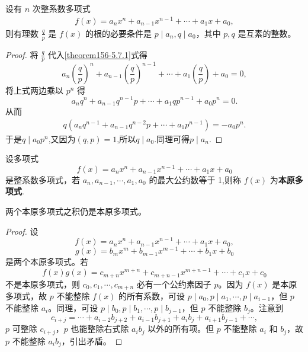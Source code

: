 \documentclass[lang=cn,newtx,10pt,scheme=chinese]{elegantbook}
\begin{document}
\begin{theorem}[整系数多项式有理根定理]\label{theorem:整系数多项式有理根定理}
设有 \( n \) 次整系数多项式
\begin{align}
f(x) = a_n x^n + a_{n-1} x^{n-1} + \cdots + a_1 x + a_0, \label{theorem156-5.7.1}
\end{align}
则有理数 \( \frac{q}{p} \) 是 \( f(x) \) 的根的必要条件是 \( p \mid a_n, q \mid a_0 \)，其中 \( p, q \) 是互素的整数。
\end{theorem}
\begin{proof}
将 \( \frac{q}{p} \) 代入\eqref{theorem156-5.7.1}式得
\[
a_n \left( \frac{q}{p} \right)^n + a_{n-1} \left( \frac{q}{p} \right)^{n-1} + \cdots + a_1 \left( \frac{q}{p} \right) + a_0 = 0,
\]
将上式两边乘以 \( p^n \) 得
\[
a_n q^n + a_{n-1} q^{n-1} p + \cdots + a_1 q p^{n-1} + a_0 p^n = 0.
\]
从而
\begin{align*}
q\left( a_nq^{n-1}+a_{n-1}q^{n-2}p+\cdots +a_1p^{n-1} \right) =-a_0p^n.
\end{align*}
于是$q\mid a_0p^n$,又因为$(q,p)=1$,所以$q\mid a_0$.同理可得$p \mid a_n$.
\end{proof}

\begin{definition}[本原多项式]
设多项式
\[
f(x) = a_n x^n + a_{n-1} x^{n-1} + \cdots + a_1 x + a_0
\]
是整系数多项式，若 \( a_n, a_{n-1}, \cdots, a_1, a_0 \) 的最大公约数等于 1,则称 \( f(x) \) 为\textbf{本原多项式}.
\end{definition}

\begin{lemma}[Gauss引理]\label{lemma:Gauss引理}
两个本原多项式之积仍是本原多项式。
\end{lemma}
\begin{proof}
设
\[
f(x) = a_n x^n + a_{n-1} x^{n-1} + \cdots + a_1 x + a_0,
\]
\[
g(x) = b_m x^m + b_{m-1} x^{m-1} + \cdots + b_1 x + b_0
\]
是两个本原多项式。若
\[
f(x) g(x) = c_{m+n} x^{m+n} + c_{m+n-1} x^{m+n-1} + \cdots + c_1 x + c_0
\]
不是本原多项式，则 \( c_0, c_1, \cdots, c_{m+n} \) 必有一个公约素因子 \( p \)。因为 \( f(x) \) 是本原多项式，故 \( p \) 不能整除 \( f(x) \) 的所有系数，可设 \( p \mid a_0, p \mid a_1, \cdots, p \mid a_{i-1} \)，但 \( p \) 不能整除 \( a_i \)。同理，可设 \( p \mid b_0, p \mid b_1, \cdots, p \mid b_{j-1} \)，但 \( p \) 不能整除 \( b_j \)。注意到
\[
c_{i+j} = \cdots + a_{i-2} b_{j+2} + a_{i-1} b_{j+1} + a_i b_j + a_{i+1} b_{j-1} + \cdots,
\]
\( p \) 可整除 \( c_{i+j} \)，\( p \) 也能整除右式除 \( a_i b_j \) 以外的所有项。但 \( p \) 不能整除 \( a_i \) 和 \( b_j \)，故 \( p \) 不能整除 \( a_i b_j \)，引出矛盾。
\end{proof}
\end{document}
